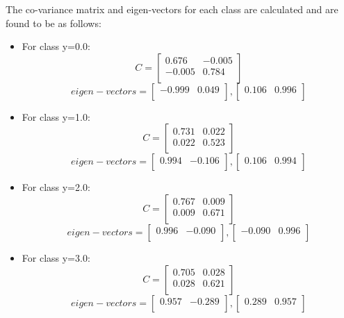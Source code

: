 \documentclass[11pt,a4paper]{article}
\newcommand{\noi}{\noindent}
\begin{document}
\noi
The co-variance matrix and eigen-vectors for each class are calculated and are found to be as follows:
\begin{itemize}
    \item For class y=0.0: 
    $$
    C = 
    \begin{bmatrix}
    0.676 & -0.005 \\
    -0.005 & 0.784 \\
    \end{bmatrix}
    $$
    $$
    eigen-vectors = 
    \begin{bmatrix}
    -0.999 & 0.049 \\
    \end{bmatrix}
    ,
    \begin{bmatrix}
    0.106 & 0.996 \\
    \end{bmatrix}
    $$
    \item For class y=1.0:
    $$
    C = 
    \begin{bmatrix}
    0.731 & 0.022 \\
    0.022 & 0.523 \\
    \end{bmatrix}
    $$
    $$
    eigen-vectors = 
    \begin{bmatrix}
    0.994 & -0.106 \\
    \end{bmatrix}
    ,
    \begin{bmatrix}
    0.106 & 0.994 \\
    \end{bmatrix}
    $$
    \item For class y=2.0:
    $$
    C = 
    \begin{bmatrix}
    0.767 & 0.009 \\
    0.009 & 0.671 \\
    \end{bmatrix}
    $$
    $$
    eigen-vectors = 
    \begin{bmatrix}
    0.996 & -0.090 \\
    \end{bmatrix}
    ,
    \begin{bmatrix}
    -0.090 & 0.996 \\
    \end{bmatrix}
    $$
    \item For class y=3.0:
    $$
    C = 
    \begin{bmatrix}
    0.705 & 0.028 \\
    0.028 & 0.621 \\
    \end{bmatrix}
    $$
    $$
    eigen-vectors = 
    \begin{bmatrix}
    0.957 & -0.289 \\
    \end{bmatrix}
    ,
    \begin{bmatrix}
    0.289 & 0.957 \\
    \end{bmatrix}
    $$
\end{itemize}
\end{document}
